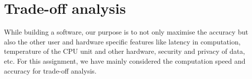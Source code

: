 \documentclass{article}
\begin{document}
\section{Trade-off analysis}
While building a software, our purpose is to not only maximise the accuracy but also the other user and hardware specific features like latency in computation, temperature of the CPU unit and other hardware, security and privacy of data, etc. For this assignment, we have mainly considered the computation speed and accuracy for trade-off analysis.


\end{document}
